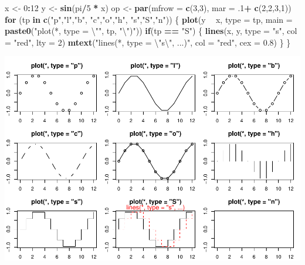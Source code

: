 \documentclass[
]{book}
\newenvironment{Shaded}{\begin{snugshade}}{\end{snugshade}}
\newcommand{\CharTok}[1]{\textcolor[rgb]{0.31,0.60,0.02}{#1}}
\newcommand{\ControlFlowTok}[1]{\textcolor[rgb]{0.13,0.29,0.53}{\textbf{#1}}}
\newcommand{\DataTypeTok}[1]{\textcolor[rgb]{0.13,0.29,0.53}{#1}}
\newcommand{\DecValTok}[1]{\textcolor[rgb]{0.00,0.00,0.81}{#1}}
\newcommand{\FloatTok}[1]{\textcolor[rgb]{0.00,0.00,0.81}{#1}}
\newcommand{\KeywordTok}[1]{\textcolor[rgb]{0.13,0.29,0.53}{\textbf{#1}}}
\newcommand{\NormalTok}[1]{#1}
\newcommand{\OperatorTok}[1]{\textcolor[rgb]{0.81,0.36,0.00}{\textbf{#1}}}
\newcommand{\StringTok}[1]{\textcolor[rgb]{0.31,0.60,0.02}{#1}}
\begin{document}
\begin{Shaded}
\begin{Highlighting}[]
\NormalTok{x <-}\StringTok{ }\DecValTok{0}\OperatorTok{:}\DecValTok{12}
\NormalTok{y <-}\StringTok{ }\KeywordTok{sin}\NormalTok{(pi}\OperatorTok{/}\DecValTok{5} \OperatorTok{*}\StringTok{ }\NormalTok{x)}
\NormalTok{op <-}\StringTok{ }\KeywordTok{par}\NormalTok{(}\DataTypeTok{mfrow =} \KeywordTok{c}\NormalTok{(}\DecValTok{3}\NormalTok{,}\DecValTok{3}\NormalTok{), }\DataTypeTok{mar =} \FloatTok{.1}\OperatorTok{+}\StringTok{ }\KeywordTok{c}\NormalTok{(}\DecValTok{2}\NormalTok{,}\DecValTok{2}\NormalTok{,}\DecValTok{3}\NormalTok{,}\DecValTok{1}\NormalTok{))}
\ControlFlowTok{for}\NormalTok{ (tp }\ControlFlowTok{in} \KeywordTok{c}\NormalTok{(}\StringTok{"p"}\NormalTok{,}\StringTok{"l"}\NormalTok{,}\StringTok{"b"}\NormalTok{,  }\StringTok{"c"}\NormalTok{,}\StringTok{"o"}\NormalTok{,}\StringTok{"h"}\NormalTok{,  }\StringTok{"s"}\NormalTok{,}\StringTok{"S"}\NormalTok{,}\StringTok{"n"}\NormalTok{)) \{}
  \KeywordTok{plot}\NormalTok{(y }\OperatorTok{~}\StringTok{ }\NormalTok{x, }\DataTypeTok{type =}\NormalTok{ tp, }\DataTypeTok{main =} \KeywordTok{paste0}\NormalTok{(}\StringTok{"plot(*, type = }\CharTok{\textbackslash{}"}\StringTok{"}\NormalTok{, tp, }\StringTok{"}\CharTok{\textbackslash{}"}\StringTok{)"}\NormalTok{))}
  \ControlFlowTok{if}\NormalTok{(tp }\OperatorTok{==}\StringTok{ "S"}\NormalTok{) \{}
    \KeywordTok{lines}\NormalTok{(x, y, }\DataTypeTok{type =} \StringTok{"s"}\NormalTok{, }\DataTypeTok{col =} \StringTok{"red"}\NormalTok{, }\DataTypeTok{lty =} \DecValTok{2}\NormalTok{)}
    \KeywordTok{mtext}\NormalTok{(}\StringTok{"lines(*, type = }\CharTok{\textbackslash{}"}\StringTok{s}\CharTok{\textbackslash{}"}\StringTok{, ...)"}\NormalTok{, }\DataTypeTok{col =} \StringTok{"red"}\NormalTok{, }\DataTypeTok{cex =} \FloatTok{0.8}\NormalTok{)}
\NormalTok{  \}}
\NormalTok{\}}
\end{Highlighting}
\end{Shaded}

\includegraphics{TudodoR_files/figure-latex/unnamed-chunk-154-1.pdf}
\end{document}
